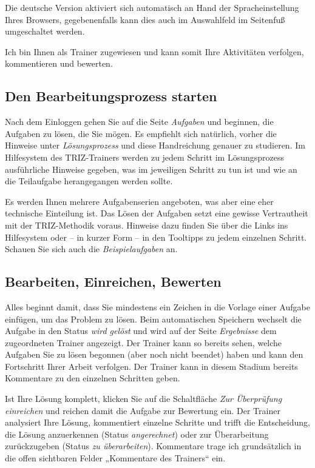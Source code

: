 \documentclass[11pt,a4paper]{article}
\begin{document}
Die deutsche Version aktiviert sich automatisch an Hand der Spracheinstellung
Ihres Browsers, gegebenenfalls kann dies auch im Auswahlfeld im Seitenfuß
umgeschaltet werden.

Ich bin Ihnen als Trainer zugewiesen und kann somit Ihre Aktivitäten
verfolgen, kommentieren und bewerten.

\subsection{Den Bearbeitungsprozess starten}

Nach dem Einloggen gehen Sie auf die Seite \emph{Aufgaben} und beginnen, die
Aufgaben zu lösen, die Sie mögen.  Es empfiehlt sich natürlich, vorher die
Hinweise unter \emph{Lösungsprozess} und diese Handreichung genauer zu
studieren.  Im Hilfesystem des TRIZ-Trainers werden zu jedem Schritt im
Lösungsprozess ausführliche Hinweise gegeben, was im jeweiligen Schritt zu tun
ist und wie an die Teilaufgabe herangegangen werden sollte.

Es werden Ihnen mehrere Aufgabenserien angeboten, was aber eine eher
technische Einteilung ist.  Das Lösen der Aufgaben setzt eine gewisse
Vertrautheit mit der TRIZ-Methodik voraus. Hinweise dazu finden Sie über die
Links ins Hilfesystem oder -- in kurzer Form -- in den Tooltipps zu jedem
einzelnen Schritt. Schauen Sie sich auch die \emph{Beispielaufgaben} an.

\subsection{Bearbeiten, Einreichen, Bewerten} 

Alles beginnt damit, dass Sie mindestens ein Zeichen in die Vorlage einer
Aufgabe einfügen, um das Problem zu lösen. Beim automatischen Speichern
wechselt die Aufgabe in den Status \emph{wird gelöst} und wird auf der Seite
\emph{Ergebnisse} dem zugeordneten Trainer angezeigt. Der Trainer kann so
bereits sehen, welche Aufgaben Sie zu lösen begonnen (aber noch nicht beendet)
haben und kann den Fortschritt Ihrer Arbeit verfolgen. Der Trainer kann in
diesem Stadium bereits Kommentare zu den einzelnen Schritten geben.

Ist Ihre Lösung komplett, klicken Sie auf die Schaltfläche \emph{Zur
  Überprüfung einreichen} und reichen damit die Aufgabe zur Bewertung ein.
Der Trainer analysiert Ihre Lösung, kommentiert einzelne Schritte und trifft
die Entscheidung, die Lösung anzuerkennen (Status \emph{angerechnet}) oder zur
Überarbeitung zurückzugeben (Status \emph{zu überarbeiten}).  Kommentare trage
ich grundsätzlich in die offen sichtbaren Felder „Kommentare des Trainers“
ein.
\end{document}

